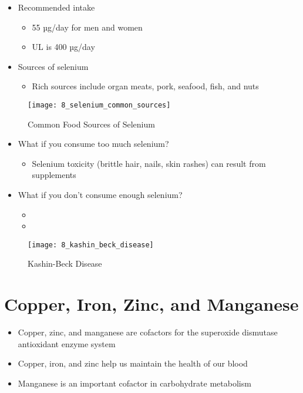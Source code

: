 \documentclass[title={Chapter 8}]{fdsn201notes}
\begin{document}
\begin{itemize}
	\item Recommended intake
	\begin{itemize}
		\item 55 µg/day for men and women
		\item UL is 400 µg/day
	\end{itemize}
	\item Sources of selenium
	\begin{itemize}
		\item Rich sources include organ meats, pork, seafood, fish, and nuts
	\end{itemize}
\end{itemize}

\begin{figure}[H]
	\centering
	\texttt{[image: 8\_selenium\_common\_sources]}
	\caption{Common Food Sources of Selenium}
	\label{fig:common-food-sources-of-selenium}
\end{figure}

\begin{itemize}
	\item What if you consume too much selenium?
	\begin{itemize}
		\item Selenium toxicity (brittle hair, nails, skin rashes) can result from supplements
	\end{itemize}
	\item What if you don’t consume enough selenium?
	\begin{itemize}
		\item {}
		\item {}
	\end{itemize}
\end{itemize}

\begin{figure}[H]
	\centering
	\texttt{[image: 8\_kashin\_beck\_disease]}
	\caption{Kashin-Beck Disease}
	\label{fig:kashin-beck-disease}
\end{figure}


\section{Copper, Iron, Zinc, and Manganese}\label{sec:copper-iron-zinc-and-manganese}
\begin{itemize}
	\item Copper, zinc, and manganese are cofactors for the superoxide dismutase antioxidant enzyme system
	\item Copper, iron, and zinc help us maintain the health of our blood
	\item Manganese is an important cofactor in carbohydrate metabolism
\end{itemize}
\end{document}
